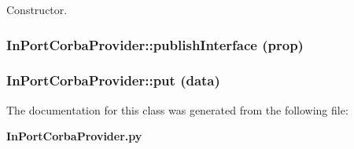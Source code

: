 Constructor. 

\subsubsection{\setlength{\rightskip}{0pt plus 5cm}In\-Port\-Corba\-Provider::publish\-Interface (prop)}\label{classInPortCorbaProvider_InPortCorbaProvidera1}


\subsubsection{\setlength{\rightskip}{0pt plus 5cm}In\-Port\-Corba\-Provider::put (data)}\label{classInPortCorbaProvider_InPortCorbaProvidera3}




The documentation for this class was generated from the following file:\begin{CompactItemize}
\item 
{\bf In\-Port\-Corba\-Provider.py}\end{CompactItemize}
